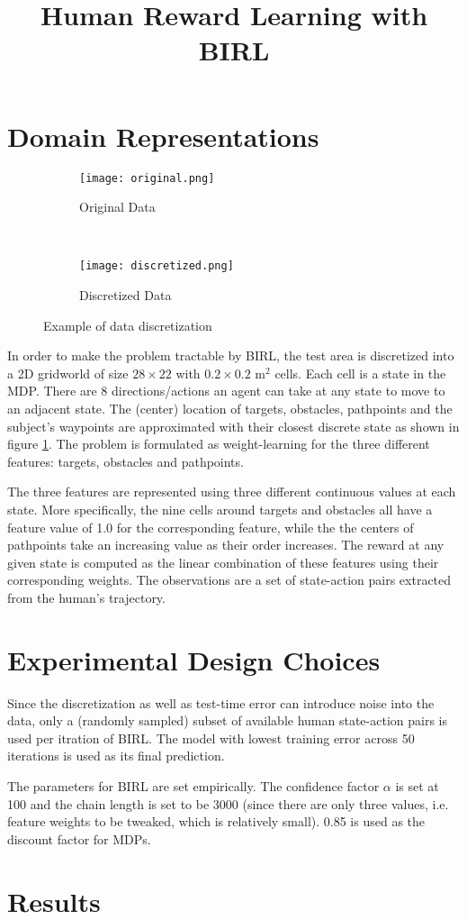 \documentclass[12pt]{article}
\title{\LARGE \bf  Human Reward Learning with BIRL }
\begin{document}
\thispagestyle{fancy}
    \maketitle
    \pagestyle{fancy}

\section{Domain Representations}

\begin{figure}[h!]
    \centering
    \begin{subfigure}[h]{0.45\textwidth}
        \centering
        \texttt{[image: original.png]}
        \caption{Original Data}
    \end{subfigure}
    ~ 
    \begin{subfigure}[h]{0.45\textwidth}
        \centering
        \texttt{[image: discretized.png]}
        \caption{Discretized Data}
    \end{subfigure}
    \caption{Example of data discretization}
    \label{gridworld}
\end{figure}

In order to make the problem tractable by BIRL, the test area is discretized into a 2D gridworld of size $28\times 22$ with $0.2 \times 0.2$ $\text{m}^2$ cells. Each cell is a state in the MDP. There are 8 directions/actions an agent can take at any state to move to an adjacent state. The (center) location of targets, obstacles,  pathpoints and the subject's waypoints are approximated with their closest discrete state as shown in figure \ref{gridworld}.  The problem is formulated as weight-learning for the three different features: targets, obstacles and pathpoints.  \par
The three features are represented using three different continuous values at each state. More specifically, the nine cells around targets and obstacles all have a feature value of 1.0 for the corresponding feature, while the the centers of pathpoints take an increasing value as their order increases. The reward at any given state is computed as the linear combination of these features using their corresponding weights. The observations are a set of state-action pairs extracted from the human's trajectory.\par

\section{Experimental Design Choices}
Since the discretization as well as test-time error can introduce noise into the data, only a (randomly sampled) subset of available human state-action pairs is used per itration of BIRL. The model with lowest training error across 50 iterations is used as its final prediction. \par

The parameters for BIRL are set empirically. The confidence factor $\alpha$ is set at 100 and the chain length is set to be 3000 (since there are only three values, i.e. feature weights to be tweaked, which is relatively small). 0.85 is used as the discount factor for MDPs. \par


\section{Results}
\end{document}
